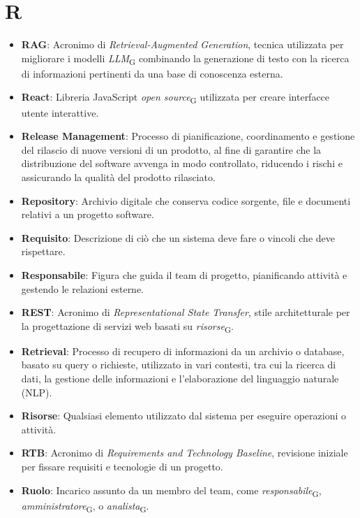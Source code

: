 \section{R} 
\begin{itemize}
\item \textbf{RAG}: Acronimo di \textit{Retrieval-Augmented Generation}, tecnica utilizzata per migliorare i modelli 
\textit{LLM}\textsubscript{G} combinando la generazione di testo con la ricerca di informazioni pertinenti da una base di conoscenza esterna. 
\item \textbf{React}: Libreria JavaScript \textit{open source}\textsubscript{G} utilizzata per creare interfacce utente interattive. 
\item \textbf{Release Management}: Processo di pianificazione, coordinamento e gestione del rilascio di nuove versioni di un prodotto, al fine di garantire che la distribuzione del software avvenga in modo controllato, riducendo i rischi e assicurando la qualità del prodotto rilasciato.
\item \textbf{Repository}: Archivio digitale che conserva codice sorgente, file e documenti relativi a un progetto software.
\item \textbf{Requisito}: Descrizione di ciò che un sistema deve fare o vincoli che deve rispettare.
\item \textbf{Responsabile}: Figura che guida il team di progetto, pianificando attività e gestendo le relazioni esterne.
\item \textbf{REST}: Acronimo di \textit{Representational State Transfer}, stile architetturale per la progettazione di servizi web basati su \textit{risorse}\textsubscript{G}.
\item \textbf{Retrieval}: Processo di recupero di informazioni da un archivio o database, basato su query o richieste, utilizzato in vari contesti, tra cui la ricerca di dati, la gestione delle informazioni e l'elaborazione del linguaggio naturale (NLP).
\item \textbf{Risorse}: Qualsiasi elemento utilizzato dal sistema per eseguire operazioni o attività.
\item \textbf{RTB}: Acronimo di \textit{Requirements and Technology Baseline}, revisione iniziale per fissare requisiti e tecnologie di un progetto.
\item \textbf{Ruolo}: Incarico assunto da un membro del team, come \textit{responsabile}\textsubscript{G}, \textit{amministratore}\textsubscript{G}, o \textit{analista}\textsubscript{G}.
\end{itemize}